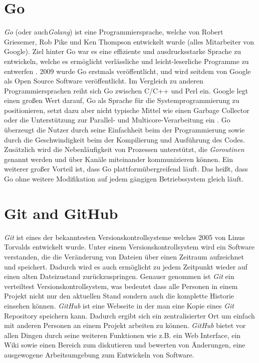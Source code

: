 \section{Go}
\textit{Go} (oder auch\textit{Golang}) ist eine Programmiersprache, welche von
Robert Griesemer, Rob Pike und Ken Thompson entwickelt wurde (alles Mitarbeiter
von Google). Ziel hinter Go war es eine effiziente und ausdrucksstarke Sprache zu entwickeln, welche es ermöglicht verlässliche und
leicht-leserliche Programme zu entwerfen \autocite{donovan_kernighan_2016}.
2009 wurde Go erstmals veröffentlicht, und wird seitdem von Google als Open Source
Software veröffentlicht. \newline
Im Vergleich zu anderen Programmiersprachen reiht sich Go zwischen C/C++ und
Perl ein. Google legt einen großen Wert darauf, Go als Sprache für die
Systemprogrammierung zu positionieren, setzt dazu aber nicht typische Mittel
wie einen Garbage Collector oder die Unterstützung zur Parallel- und
Multicore-Verarbeitung ein \autocite{feike_blass_2012}. Go überzeugt die Nutzer
durch seine Einfachheit beim der Programmierung sowie durch die Geschwindigkeit beim
der Kompilierung und Ausführung des Codes. Zusätzlich wird die Nebenläufigkeit von
Prozessen unterstützt, die \textit{Goroutinen} genannt werden und über Kanäle
miteinander kommunizieren können. 
Ein weiterer großer Vorteil ist, dass Go plattformübergreifend läuft. Das heißt,
dass Go ohne weitere Modifikation auf jedem gängigen Betriebssystem gleich
läuft.
\autocite{donovan_kernighan_2016}


\section{Git and GitHub}
\textit{Git} ist eines der bekanntesten Versionskontrollsysteme welches 2005
von Linus Torvalds entwickelt wurde. Unter einem Versionskontrollsystem wird
ein Software verstanden, die die Veränderung von Dateien über einen Zeitraum
aufzeichnet und speichert. Dadurch wird es auch ermöglicht zu jedem Zeitpunkt
wieder auf einen alten Dateizustand zurückzuspringen.  Genauer genommen ist
\textit{Git} ein verteiltest Versionskontrollsystem, was bedeutet dass alle
Personen in einem  Projekt nicht nur den aktuellen Stand sondern auch die
komplette Historie einsehen können. \autocite{preissel_stachmann_2017}
\newline
\newline
\textit{GitHub} ist eine Webseite in der man eine Kopie eines \textit{Git}
Repository speichern kann. Dadurch ergibt sich ein zentralisierter Ort um
einfach mit anderen Personen an einem Projekt  arbeiten zu können.
\textit{GitHub} bietet vor allen Dingen durch seine weiteren Funktionen wie
z.B. ein Web Interface, ein Wiki sowie einen Bereich zum diskutieren und
bewerten von Änderungen, eine ausgewogene Arbeitsumgebung zum Entwickeln von
Software. \autocite{bell_2014}
